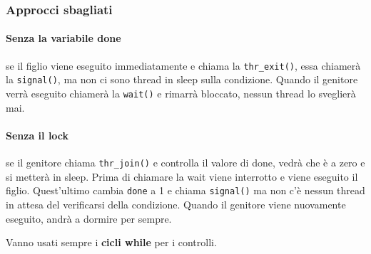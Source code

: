 \documentclass[12pt, twoside, letterpaper]{article}
\begin{document}
			\subsubsection{Approcci sbagliati}
				\paragraph{Senza la variabile done} se il figlio viene eseguito immediatamente e chiama la \texttt{thr\_exit()}, essa chiamerà la \texttt{signal()}, ma non ci sono thread in sleep sulla condizione. Quando il genitore verrà eseguito chiamerà la \texttt{wait()} e rimarrà bloccato, nessun thread lo sveglierà mai. 
			
				\paragraph{Senza il lock} se il genitore chiama \texttt{thr\_join()} e controlla il valore di done, vedrà che è a zero e si metterà in sleep. Prima di chiamare la wait viene interrotto e viene eseguito il figlio. Quest'ultimo cambia \texttt{done} a 1 e chiama \texttt{signal()} ma non c'è nessun thread in attesa del verificarsi della condizione. Quando il genitore viene nuovamente eseguito, andrà a dormire per sempre.
			
				Vanno usati sempre i \textbf{cicli while} per i controlli.
			
\end{document}
